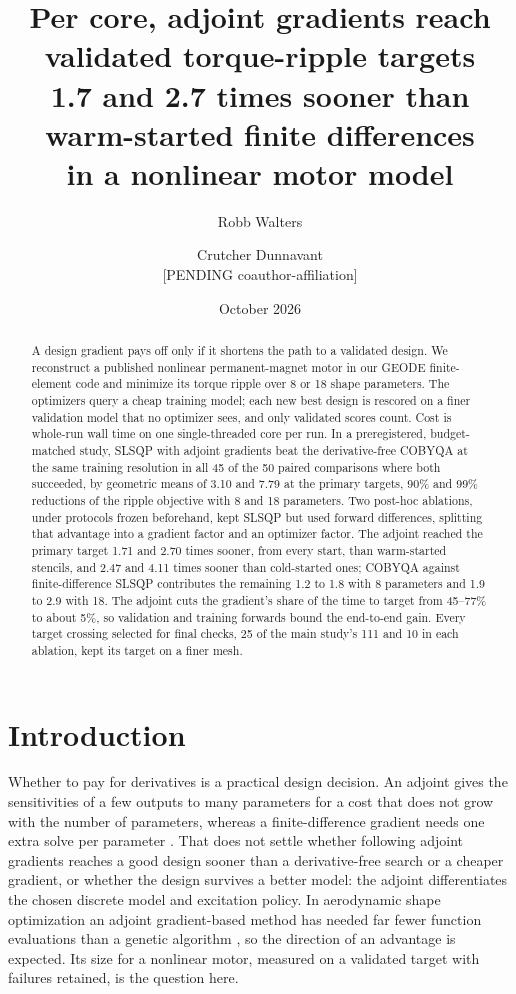 \documentclass{anvil-paper}
\title{Per core, adjoint gradients reach validated torque-ripple targets\\
1.7 and 2.7 times sooner than warm-started finite differences\\in a nonlinear motor model}
\author{Robb Walters \and Crutcher Dunnavant\\{\normalsize [PENDING coauthor-affiliation]}}
\date{October 2026}
\begin{document}
\maketitle
\begin{abstract}
A design gradient pays off only if it shortens the path to a validated
design. We reconstruct a published nonlinear
permanent-magnet motor in our GEODE finite-element code and minimize its
torque ripple over 8 or 18 shape parameters. The optimizers query a cheap
training model; each new best design is rescored on a finer validation
model that no optimizer sees, and only validated scores count. Cost is
whole-run wall time on one single-threaded core per run. In a
preregistered, budget-matched study, SLSQP with adjoint gradients beat the
derivative-free COBYQA at the same training resolution in all 45 of the 50
paired comparisons where both succeeded, by geometric means of 3.10 and
7.79 at the primary targets, 90\% and 99\% reductions of the ripple
objective with 8 and 18 parameters. Two post-hoc ablations, under
protocols frozen beforehand, kept SLSQP but used forward differences,
splitting that advantage into a gradient factor and an optimizer factor.
The adjoint reached the primary target 1.71 and 2.70 times sooner, from
every start, than warm-started stencils, and 2.47 and 4.11 times sooner
than cold-started ones; COBYQA against
finite-difference SLSQP contributes the remaining 1.2 to 1.8 with 8
parameters and 1.9 to 2.9 with 18. The adjoint cuts the gradient's share
of the time to target from 45--77\% to about 5\%, so validation and
training forwards bound the end-to-end gain. Every target crossing
selected for final checks, 25 of the main study's 111 and 10 in each
ablation, kept its target on a finer mesh.
\end{abstract}

\section{Introduction}
Whether to pay for derivatives is a practical design decision. An adjoint
gives the sensitivities of a few outputs to many parameters for a cost
that does not grow with the number of parameters, whereas a
finite-difference gradient needs one extra solve per parameter
\citep{giles2000introduction,martins2013review}. That does not settle
whether following adjoint gradients reaches a good design sooner than a
derivative-free search or a cheaper gradient, or whether the design
survives a better model: the adjoint differentiates the chosen discrete
model and excitation policy. In aerodynamic shape optimization an adjoint
gradient-based method has needed far fewer function evaluations than a
genetic algorithm \citep{zingg2008comparative}, so the direction of an
advantage is expected. Its size for a nonlinear motor, measured on a
validated target with failures retained, is the question here.
\end{document}
